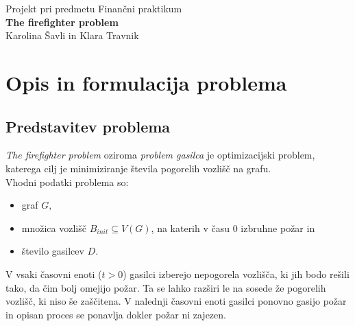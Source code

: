 \documentclass[a4paper, 12pt]{article}
\begin{document}
    
\thispagestyle{empty}
\vfill

\begin{center}{\large
Projekt pri predmetu Finančni praktikum\\[5mm]
{\Huge \bf The firefighter problem}\\[5mm]
Karolina Šavli in Klara Travnik\\[1cm]}
\end{center}
\vfill

\pagebreak


\tableofcontents

\pagebreak


\section{Opis in formulacija problema}

\subsection{Predstavitev problema}
\noindent \emph{The firefighter problem} oziroma \emph{problem gasilca} je optimizacijski problem, katerega cilj je 
minimiziranje števila pogorelih vozlišč na grafu. \\
Vhodni podatki problema so:
\begin{itemize}
    \item graf $G,$
    \item množica vozlišč $B_{init} \subseteq V\left(G\right)$, na katerih v času $0$ izbruhne požar in
    \item število gasilcev $D$.
\end{itemize} 
V vsaki časovni enoti ($t > 0$) gasilci izberejo nepogorela vozlišča, ki jih bodo rešili tako,
da čim bolj omejijo požar. Ta se lahko razširi le na sosede že pogorelih vozlišč, ki niso še zaščitena. 
V nalednji časovni enoti gasilci ponovno gasijo požar in opisan
proces se ponavlja dokler požar ni zajezen. \\
\end{document}
